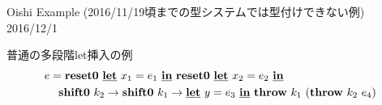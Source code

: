 \documentclass[dvipdfmx]{jsarticle}
\newcommand\longer[2]{{#1} \ord {#2}}
\newcommand\uni{\cup} %
\begin{document}
\begin{center}
  Oishi Example (2016/11/19頃までの型システムでは型付けできない例) \\
  2016/12/1
\end{center}

普通の多段階let挿入の例
\begin{align*}
  e &= \textbf{reset0}~\underline{\textbf{let}}~x_1=e_1~\underline{\textbf{in}}~\textbf{reset0}~\underline{\textbf{let}}~x_2=e_2~\underline{\textbf{in}} \\
    &\phantom{=}  \textbf{shift0}~{k_2}\to{\textbf{shift0}~{k_1}\to{\underline{\textbf{let}}~y=e_3~\underline{\textbf{in}}~\textbf{throw}~{k_1}~{(\textbf{throw}~{k_2}~{e_4})}}}
\end{align*}

\newcommand\tzero{\codeT{t}{\gamma_0}}
\newcommand\tone{\codeT{t}{\gamma_1}}
\newcommand\ttwo{\codeT{t}{\gamma_2}}
\newcommand\tthree{\codeT{t}{\gamma_3}}
\newcommand\tonethree{\codeT{t}{\gamma_1\uni\gamma_3}}
\newcommand\tall{\codeT{t}{\gamma_2\uni\gamma_1\uni\gamma_3}}
\newcommand\Gammaone{
  \longer{\gamma_1}{\gamma_0},~x_1:\tone \vdash
  \cLet~x_2=e_2~\cIn~\cdots : \tone;~\tone,\tzero}
\newcommand\Gammatwo{
  \Gamma_1,~k_2:\contT{\ttwo}{\tone}{\tzero},
  ~k_1:\contT{\tone}{\tzero}{\cdot{}}}

\def\proofone{
  \infer
  {\vdash e:\tzero;~\cdot{}}
  {
    \infer{\vdash \cLet~x_1=e_1~\cIn~\Resetz~\cLet~x_2=e_2~\cIn~\cdots :
      \tzero;~\tzero
    }
    {\infer{\longer{\gamma_1}{\gamma_0},~x_1:\tone \vdash
        \Resetz~\cLet~x_2=e_2~\cIn~\cdots : \tone;~\tzero
      }
      {\prooftwo}
    }
  }
}
\def\prooftwo{
  \infer{\longer{\gamma_1}{\gamma_0},~x_1:\tone \vdash
    \cLet~x_2=e_2~\cIn~\cdots : \tone;~\tone,\tzero}
  {\infer{\Gamma_1=\longer{\gamma_2}{\gamma_1},~x_2:\ttwo,~\longer{\gamma_1}{\gamma_0},~x_1:\tone \vdash
      \shiftz{k_2}{\shiftz{k_1}{\cdots}} : \ttwo;~\tone,\tzero
    }
    {\proofthree}
  }
}

\def\proofthree{
  \infer{\Gamma_1,~k_2:\contT{\ttwo}{\tone}{\tzero}
    \vdash \shiftz{k_1}{\cdots} : \tone;~\tzero
  }
  {\infer{\Gamma_2=\Gamma_1,~k_2:\contT{\ttwo}{\tone}{\tzero},
      ~k_1:\contT{\tone}{\tzero}{\cdot{}},
      \vdash \cLet~y=e_3~\cIn~\cdots : \tzero;~\cdot{}
    }
    {\prooffour}
  }
}

\def\prooffour{
  \infer[(*)]{\Gamma_3=\Gamma_2,~\longer{\gamma_3}{\gamma_0},~y:\tthree \vdash \throw{k_1}{(\throw{k_2}{e_4})} :
    \tthree;~\cdot{}}
  {\infer{\Gamma_3 \vdash \throw{k_2}{e_4} : \tonethree;~\tone}
    { \Gamma_3 \vdash e_4 : \tall;~\cdot
      & \infer{\Gamma_3 \models \longer{\gamma_1\uni\gamma_3}{\gamma_1}}{}
    }
    & \infer{\Gamma_3 \models \longer{\gamma_3}{\gamma_0}}{}
  }
}
\end{document}
